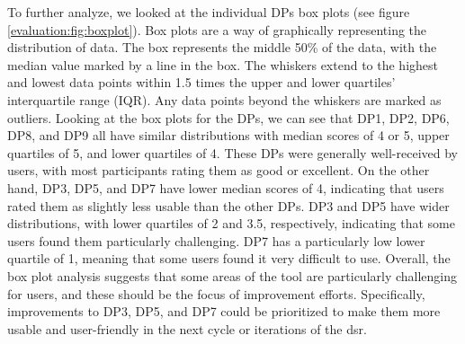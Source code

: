 To further analyze, we looked at the individual DPs box plots (see figure \ref{evaluation:fig:boxplot}). 
Box plots are a way of graphically representing the distribution of data. 
The box represents the middle 50\% of the data, with the median value marked by a line in the box. 
The whiskers extend to the highest and lowest data points within 1.5 times the upper and lower quartiles' interquartile range (IQR). 
Any data points beyond the whiskers are marked as outliers.
Looking at the box plots for the DPs, we can see that DP1, DP2, DP6, DP8, and DP9 all have similar distributions with median scores of 4 or 5, upper quartiles of 5, and lower quartiles of 4. 
These DPs were generally well-received by users, with most participants rating them as good or excellent.
On the other hand, DP3, DP5, and DP7 have lower median scores of 4, indicating that users rated them as slightly less usable than the other DPs. 
DP3 and DP5 have wider distributions, with lower quartiles of 2 and 3.5, respectively, indicating that some users found them particularly challenging. 
DP7 has a particularly low lower quartile of 1, meaning that some users found it very difficult to use.
Overall, the box plot analysis suggests that some areas of the tool are particularly challenging for users, and these should be the focus of improvement efforts. 
Specifically, improvements to DP3, DP5, and DP7 could be prioritized to make them more usable and user-friendly in the next cycle or iterations of the \ac{dsr}.

